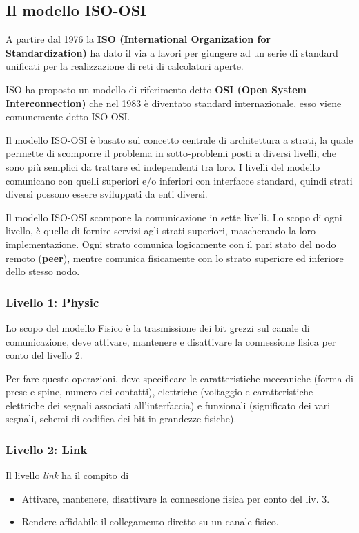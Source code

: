     \subsection{Il modello ISO-OSI}
        A partire dal 1976 la \textbf{ISO (International Organization for Standardization)} ha dato il via a lavori per giungere ad un serie di standard unificati per la realizzazione di reti di calcolatori aperte.
        
        ISO ha proposto un modello di riferimento detto \textbf{OSI (Open System Interconnection)} che nel 1983 è diventato standard internazionale, esso viene comunemente detto ISO-OSI.

        Il modello ISO-OSI è basato sul concetto centrale di architettura a strati, la quale permette di scomporre il problema in sotto-problemi posti a diversi livelli, che sono più semplici da trattare ed independenti tra loro. I livelli del modello comunicano con quelli superiori e/o inferiori con interfacce standard, quindi strati diversi possono essere sviluppati da enti diversi.

        Il modello ISO-OSI scompone la comunicazione in sette livelli. Lo scopo di ogni livello, è quello di fornire servizi agli strati superiori, mascherando la loro implementazione. Ogni strato comunica logicamente con il pari stato del nodo remoto (\textbf{peer}), mentre comunica fisicamente con lo strato superiore ed inferiore dello stesso nodo.

        \subsubsection{Livello 1: Physic}
            Lo scopo del modello Fisico è la trasmissione dei bit grezzi sul canale di comunicazione, deve attivare, mantenere e disattivare la connessione fisica per conto del livello 2.
        
            Per fare queste operazioni, deve specificare le caratteristiche meccaniche (forma di prese e spine, numero dei contatti), elettriche (voltaggio e caratteristiche elettriche dei segnali associati all'interfaccia) e funzionali (significato dei vari segnali, schemi di codifica dei bit in grandezze fisiche).

        \subsubsection{Livello 2: Link}
            Il livello \textit{link} ha il compito di 
            \begin{itemize}
                \item Attivare, mantenere, disattivare la connessione fisica per conto del liv. 3.
                \item Rendere affidabile il collegamento diretto su un canale fisico.
            \end{itemize}

